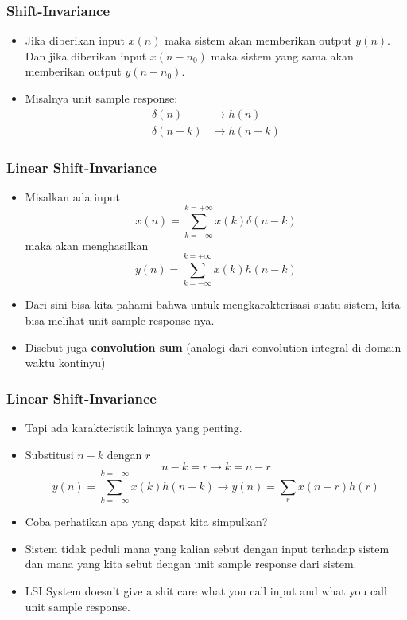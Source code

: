 \documentclass[pdflatex,compress]{beamer}
\begin{document}
\begin{frame}
	\frametitle{Shift-Invariance}
	\begin{itemize}
		\item Jika diberikan input $ x(n) $ maka sistem akan memberikan output $ y(n) $. Dan jika diberikan input $ x(n-n_0) $ maka sistem yang sama akan memberikan output $ y(n-n_0) $.
		\item Misalnya unit sample response:
		\begin{align*}
			\delta(n) &\rightarrow h(n) \\
			\delta(n-k) &\rightarrow h(n-k)
		\end{align*}
	\end{itemize}
\end{frame}

\begin{frame}
	\frametitle{Linear Shift-Invariance}
	\begin{itemize}
		\item Misalkan ada input \[ x(n) = \sum_{k = -\infty}^{k = +\infty} x(k)\delta(n-k) \]
		maka akan menghasilkan \[ y(n) = \sum_{k = -\infty}^{k = +\infty} x(k)h(n-k) \]
		\item Dari sini bisa kita pahami bahwa untuk mengkarakterisasi suatu sistem, kita bisa melihat unit sample response-nya.
		\item Disebut juga \textbf{convolution sum} (analogi dari convolution  integral di domain waktu kontinyu)
	\end{itemize}
\end{frame}

\begin{frame}
	\frametitle{Linear Shift-Invariance}
	\begin{itemize}
		\item<1-> Tapi ada karakteristik lainnya yang penting.
		\item<2-> Substitusi $ n - k $ dengan $ r $
		\[ n-k = r \rightarrow k = n-r\]
		\[ y(n) = \sum_{k = -\infty}^{k = +\infty} x(k)h(n-k) \rightarrow y(n) = \sum_r x(n-r)h(r) \]
		\item<3-> Coba perhatikan apa yang dapat kita simpulkan?
		\item<4-> Sistem tidak peduli mana yang kalian sebut dengan input terhadap sistem dan mana yang kita sebut dengan unit sample response dari sistem.
		\item<5-> LSI System doesn't \st{give a shit} care what you call input and what you call unit sample response.
	\end{itemize}
\end{frame}
\end{document}
